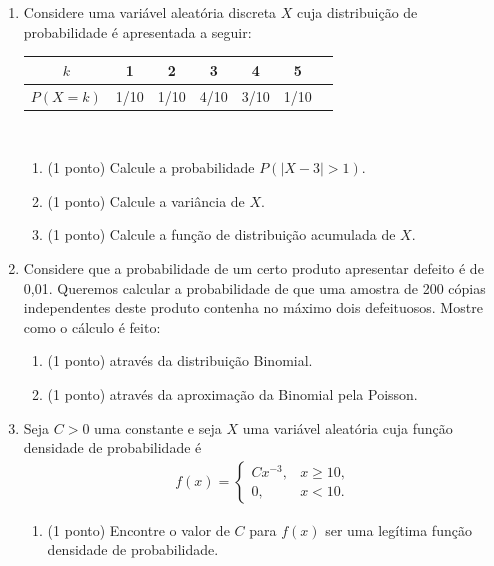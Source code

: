 \documentclass{article}
\begin{document}
\begin{enumerate}



% 
\item Considere uma variável aleatória discreta $X$ cuja distribuição de probabilidade é apresentada a seguir:
    \begin{center}
    \begin{tabular}{c|cccccc}
    \hline
    $k$ & 1 & 2 & 3 & 4 & 5 \\
    \hline
    $P(X=k)$ & 1/10 & 1/10 & 4/10 & 3/10 & 1/10 \\
    \hline
    \end{tabular}\\
    \end{center}
    \begin{enumerate}
    	\item (1 ponto) Calcule a probabilidade $P(|X-3|>1)$. 
    	\item (1 ponto) Calcule a variância de $X$.
    	\item (1 ponto) Calcule a função de distribuição acumulada de $X$.
    \end{enumerate}

\item Considere que a probabilidade de um certo produto apresentar defeito é de 0,01. Queremos calcular a probabilidade de que uma amostra de 200 cópias independentes deste produto contenha no máximo dois defeituosos. Mostre como o cálculo é feito:
\begin{enumerate}
	\item (1 ponto) através da distribuição Binomial.
	
	\item (1 ponto) através da aproximação da Binomial pela Poisson.
\end{enumerate}


\item Seja $C > 0$ uma constante e seja $X$ uma variável aleatória cuja função densidade de probabilidade é 
\begin{align*}
f(x) = \begin{cases}
C x^{-3}, & x \geq 10, \\
0, & x < 10.
\end{cases}
\end{align*}
\begin{enumerate}
	\item (1 ponto) Encontre o valor de $C$ para $f(x)$ ser uma legítima função densidade de probabilidade.


\end{enumerate}
\end{enumerate}
\end{document}
